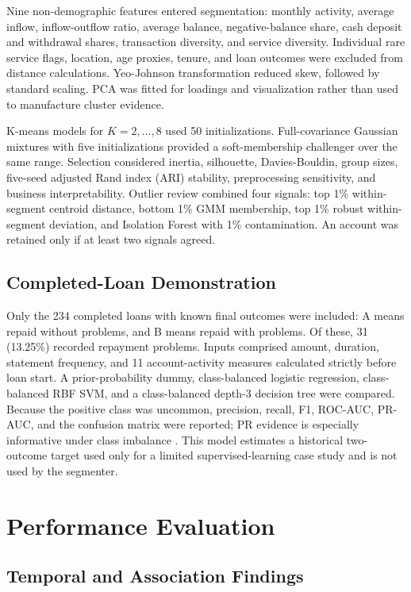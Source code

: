 \documentclass[conference]{IEEEtran}
\begin{document}
Nine non-demographic features entered segmentation: monthly activity, average inflow, inflow-outflow ratio, average balance, negative-balance share, cash deposit and withdrawal shares, transaction diversity, and service diversity. Individual rare service flags, location, age proxies, tenure, and loan outcomes were excluded from distance calculations. Yeo-Johnson transformation reduced skew, followed by standard scaling. PCA was fitted for loadings and visualization rather than used to manufacture cluster evidence.

K-means models for $K=2,\ldots,8$ used 50 initializations. Full-covariance Gaussian mixtures with five initializations provided a soft-membership challenger over the same range. Selection considered inertia, silhouette, Davies-Bouldin, group sizes, five-seed adjusted Rand index (ARI) stability, preprocessing sensitivity, and business interpretability. Outlier review combined four signals: top 1\% within-segment centroid distance, bottom 1\% GMM membership, top 1\% robust within-segment deviation, and Isolation Forest with 1\% contamination. An account was retained only if at least two signals agreed.

\subsection{Completed-Loan Demonstration}

Only the 234 completed loans with known final outcomes were included: A means repaid without problems, and B means repaid with problems. Of these, 31 (13.25\%) recorded repayment problems. Inputs comprised amount, duration, statement frequency, and 11 account-activity measures calculated strictly before loan start. A prior-probability dummy, class-balanced logistic regression, class-balanced RBF SVM, and a class-balanced depth-3 decision tree were compared. Because the positive class was uncommon, precision, recall, F1, ROC-AUC, PR-AUC, and the confusion matrix were reported; PR evidence is especially informative under class imbalance \cite{saito2015}. This model estimates a historical two-outcome target used only for a limited supervised-learning case study and is not used by the segmenter.

\section{Performance Evaluation}

\subsection{Temporal and Association Findings}
\end{document}
